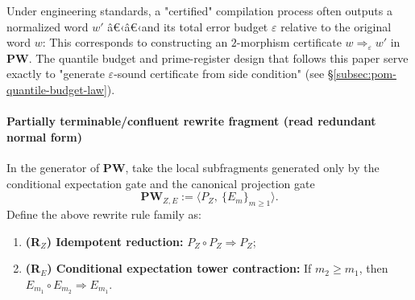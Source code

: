 \begin{remark}\label{rem:pom-compile-output-word-eps}
Under engineering standards, a "certified" compilation process often outputs a normalized word \(w'\) â€‹â€‹and its total error budget \(\varepsilon\) relative to the original word \(w\):
This corresponds to constructing an \(2\)-morphism certificate \(w\Longrightarrow_{\varepsilon} w'\) in \(\mathbf{PW}\).
The quantile budget and prime-register design that follows this paper serve exactly to "generate \(\varepsilon\)-sound certificate from side condition" (see \S\ref{subsec:pom-quantile-budget-law}).
\end{remark}

\paragraph{Partially terminable/confluent rewrite fragment (read redundant normal form)}
\begin{definition}\label{def:pom-rewrite-E-tower}
In the generator of $\mathbf{PW}$, take the local subfragments generated only by the conditional expectation gate and the canonical projection gate
\[
\mathbf{PW}_{Z,E}:=\langle P_Z,\ \{E_m\}_{m\ge 1}\rangle.
\]
Define the above rewrite rule family as:
\begin{enumerate}
  \item \textbf{(R$_Z$) Idempotent reduction:} $P_Z\circ P_Z\Rightarrow P_Z$;
  \item \textbf{(R$_E$) Conditional expectation tower contraction:} If $m_2\ge m_1$, then $E_{m_1}\circ E_{m_2}\Rightarrow E_{m_1}$.
\end{enumerate}
\end{definition}

